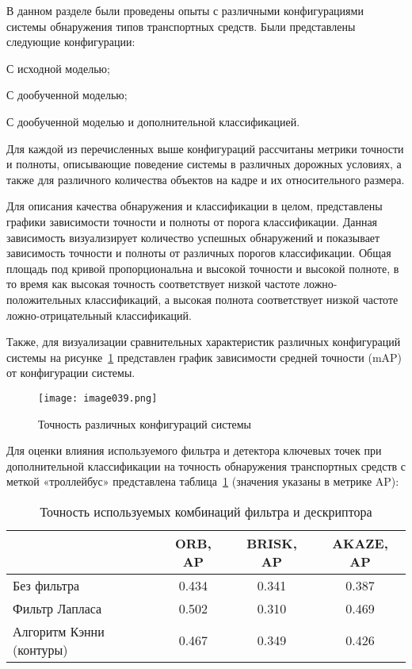 В данном разделе были проведены опыты с различными конфигурациями системы обнаружения типов транспортных средств. Были представлены следующие конфигурации:

%
\begin{itemize*}
  \item С исходной моделью;
  \item С дообученной моделью;
  \item С дообученной моделью и дополнительной классификацией.	  
\end{itemize*}
%
	
Для каждой из перечисленных выше конфигураций рассчитаны метрики точности и полноты, описывающие поведение системы в различных дорожных условиях, а также для различного количества объектов на кадре и их относительного размера. 

Для описания качества обнаружения и классификации в целом, представлены графики зависимости точности и полноты от порога классификации. Данная зависимость визуализирует количество успешных обнаружений и показывает зависимость точности и полноты от различных порогов классификации. Общая площадь под кривой пропорциональна и высокой точности и высокой полноте, в то время как высокая точность соответствует низкой частоте ложно-положительных классификаций, а высокая полнота соответствует низкой частоте ложно-отрицательный классификаций. 

Также, для визуализации сравнительных характеристик различных конфигураций системы на рисунке~\ref{fig:image039} представлен график зависимости средней точности (mAP) от конфигурации системы.

\begin{figure}[htbp]
\centering
\texttt{[image: image039.png]}
\caption{Точность различных конфигураций системы}%
\label{fig:image039}
\end{figure}

Для оценки влияния используемого фильтра и детектора ключевых точек при дополнительной классификации на точность обнаружения транспортных средств с меткой «троллейбус» представлена таблица~\ref{tabular:tab_5} (значения указаны в метрике AP):

\begin{table}[H]
	\caption{Точность используемых комбинаций фильтра и дескриптора}
	\begin{center}
		\begin{tabular}{|l|c|c|c|}
			\hline
			 & ORB, AP & BRISK, AP & AKAZE, AP\\ \hline
			Без фильтра & 0.434 & 0.341 & 0.387\\ \hline
			Фильтр Лапласа & 0.502 & 0.310 & 0.469\\ \hline
			Алгоритм Кэнни (контуры) & 0.467 & 0.349 & 0.426\\ \hline			
		\end{tabular}
		\label{tabular:tab_5}
	\end{center}
\end{table}

